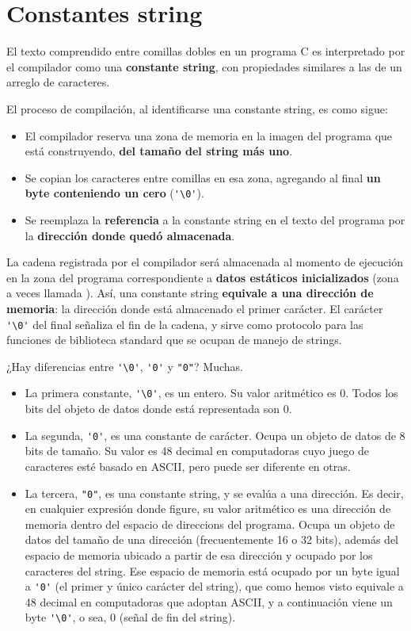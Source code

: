 \section{Constantes string}
El texto comprendido entre comillas dobles en un programa C es interpretado por el compilador
como una \textbf{constante string}, con propiedades similares a las de un arreglo de caracteres. 

El proceso de compilación, al identificarse una constante string, es como sigue:
\begin{itemize}
	\item El compilador reserva una zona de memoria en la imagen del programa que está construyendo, \textbf{del
tamaño del string más uno}.
	\item Se copian los caracteres entre comillas en esa zona, agregando al final \textbf{un byte conteniendo un
cero} (\lstinline{'\0'}).
	\item Se reemplaza la \textbf{referencia} a la constante string en el texto del programa por la \textbf{dirección donde
quedó almacenada}.
\end{itemize}

La cadena registrada por el compilador será almacenada al momento de ejecución en la zona del
programa correspondiente a \textbf{datos estáticos inicializados} (zona a veces llamada ).
Así, una constante string \textbf{equivale a una dirección de memoria}: la dirección donde está almacenado
el primer carácter. El carácter \lstinline{'\0'} del final señaliza el fin de la cadena, y sirve como protocolo para
las funciones de biblioteca standard que se ocupan de manejo de strings.

¿Hay diferencias entre \lstinline{'\0'}, \lstinline{'0'} y \lstinline{"0"}? Muchas.
\begin{itemize}
	\item La primera constante, \lstinline{'\0'}, es un entero. Su valor aritmético es 0. Todos los bits del objeto de datos donde está representada son 0.
\item La segunda, \lstinline{'0'}, es una constante de carácter. Ocupa un objeto de datos de 8 bits de tamaño. Su valor es 48 decimal
en computadoras cuyo juego de caracteres esté basado en ASCII, pero puede ser diferente en otras. 
\item La tercera, \lstinline{"0"}, es una constante string, y se evalúa a una dirección. Es decir, en cualquier expresión donde figure, su valor aritmético es una dirección de memoria dentro del espacio de direccions del programa. Ocupa un objeto de datos del
tamaño de una dirección (frecuentemente 16 o 32 bits), además del espacio de memoria ubicado a partir de esa dirección y ocupado por los caracteres del string. Ese espacio de memoria está ocupado por un byte igual a \lstinline{'0'} (el primer y único carácter del string), que como hemos visto equivale a 48 decimal en computadoras que adoptan ASCII, y a continuación viene un byte \lstinline{'\0'}, o sea, 0 (señal de fin del string).
\end{itemize}


